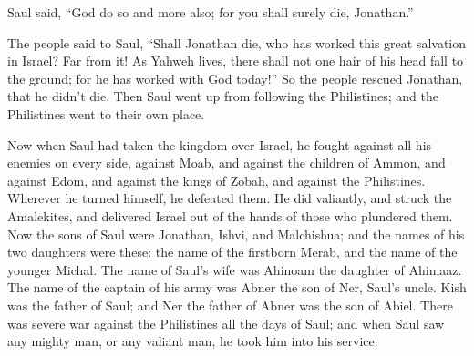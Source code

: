 {\par }{\PP {}Saul said, “God do so and more also; for you shall surely die, Jonathan.”
\par }{\PP {}The people said to Saul, “Shall Jonathan die, who has worked this great salvation in Israel? Far from it! As Yahweh lives, there shall not one hair of his head fall to the ground; for he has worked with God today!” So the people rescued Jonathan, that he didn’t die.
Then Saul went up from following the Philistines; and the Philistines went to their own place.
\par }{\PP {}Now when Saul had taken the kingdom over Israel, he fought against all his enemies on every side, against Moab, and against the children of Ammon, and against Edom, and against the kings of Zobah, and against the Philistines. Wherever he turned himself, he defeated them.
He did valiantly, and struck the Amalekites, and delivered Israel out of the hands of those who plundered them.
Now the sons of Saul were Jonathan, Ishvi, and Malchishua; and the names of his two daughters were these: the name of the firstborn Merab, and the name of the younger Michal.
The name of Saul’s wife was Ahinoam the daughter of Ahimaaz. The name of the captain of his army was Abner the son of Ner, Saul’s uncle.
Kish was the father of Saul; and Ner the father of Abner was the son of Abiel.
There was severe war against the Philistines all the days of Saul; and when Saul saw any mighty man, or any valiant man, he took him into his service.

}
